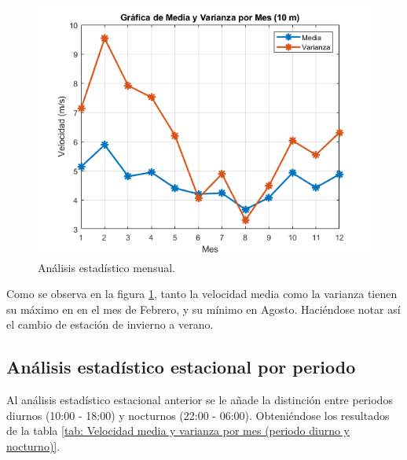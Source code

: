 \documentclass{IEEEtran}
\begin{document}
\begin{figure}[h]
    \centering
    \includegraphics[width = 0.5 \textwidth]{Imagenes/Grafica de Media y Varianza por Mes.png}
    \caption{Análisis estadístico mensual.}
    \label{fig: Analisis estadistico mensual}
\end{figure}

Como se observa en la figura \ref{fig: Analisis estadistico mensual}, tanto la velocidad media como la varianza tienen su máximo en en el mes de Febrero, y su mínimo en Agosto. Haciéndose notar así el cambio de estación de invierno a verano.

\subsection{Análisis estadístico estacional por periodo}
Al análisis estadístico estacional anterior se le añade la distinción entre periodos diurnos (10:00 - 18:00) y nocturnos (22:00 - 06:00). Obteniéndose los resultados de la tabla \ref{tab: Velocidad media y varianza por mes (periodo diurno y nocturno)}.
\end{document}
